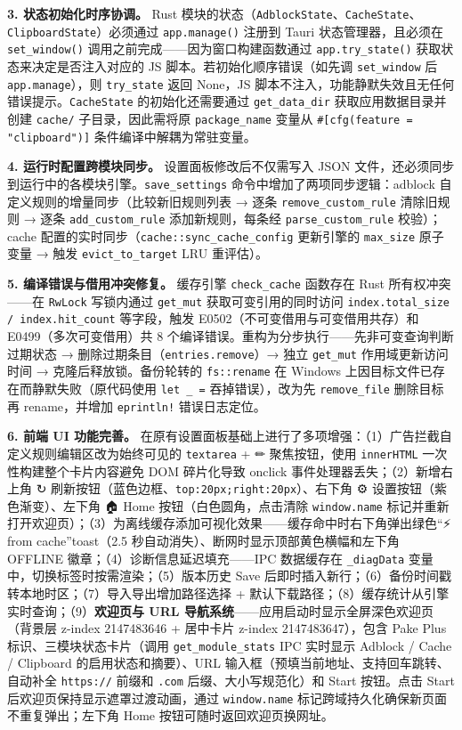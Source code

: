 \documentclass[12pt,a4paper]{ctexart}
\begin{document}
\textbf{3. 状态初始化时序协调。}
Rust 模块的状态（\texttt{AdblockState}、\texttt{CacheState}、\texttt{ClipboardState}）必须通过 \texttt{app.manage()} 注册到 Tauri 状态管理器，且必须在 \texttt{set\_window()} 调用之前完成——因为窗口构建函数通过 \texttt{app.try\_state()} 获取状态来决定是否注入对应的 JS 脚本。若初始化顺序错误（如先调 \texttt{set\_window} 后 \texttt{app.manage}），则 \texttt{try\_state} 返回 None，JS 脚本不注入，功能静默失效且无任何错误提示。\texttt{CacheState} 的初始化还需要通过 \texttt{get\_data\_dir} 获取应用数据目录并创建 \texttt{cache/} 子目录，因此需将原 \texttt{package\_name} 变量从 \texttt{\#[cfg(feature = "clipboard")]} 条件编译中解耦为常驻变量。

\textbf{4. 运行时配置跨模块同步。}
设置面板修改后不仅需写入 JSON 文件，还必须同步到运行中的各模块引擎。\texttt{save\_settings} 命令中增加了两项同步逻辑：adblock 自定义规则的增量同步（比较新旧规则列表 → 逐条 \texttt{remove\_custom\_rule} 清除旧规则 → 逐条 \texttt{add\_custom\_rule} 添加新规则，每条经 \texttt{parse\_custom\_rule} 校验）；cache 配置的实时同步（\texttt{cache::sync\_cache\_config} 更新引擎的 \texttt{max\_size} 原子变量 → 触发 \texttt{evict\_to\_target} LRU 重评估）。

\textbf{5. 编译错误与借用冲突修复。}
缓存引擎 \texttt{check\_cache} 函数存在 Rust 所有权冲突——在 \texttt{RwLock} 写锁内通过 \texttt{get\_mut} 获取可变引用的同时访问 \texttt{index.total\_size / index.hit\_count} 等字段，触发 E0502（不可变借用与可变借用共存）和 E0499（多次可变借用）共 8 个编译错误。重构为分步执行——先非可变查询判断过期状态 → 删除过期条目（\texttt{entries.remove}）→ 独立 \texttt{get\_mut} 作用域更新访问时间 → 克隆后释放锁。备份轮转的 \texttt{fs::rename} 在 Windows 上因目标文件已存在而静默失败（原代码使用 \texttt{let \_ =} 吞掉错误），改为先 \texttt{remove\_file} 删除目标再 rename，并增加 \texttt{eprintln!} 错误日志定位。

\textbf{6. 前端 UI 功能完善。}
在原有设置面板基础上进行了多项增强：（1）广告拦截自定义规则编辑区改为始终可见的 \texttt{textarea} + ✏ 聚焦按钮，使用 \texttt{innerHTML} 一次性构建整个卡片内容避免 DOM 碎片化导致 onclick 事件处理器丢失；（2）新增右上角 ↻ 刷新按钮（蓝色边框、\texttt{top:20px;right:20px}）、右下角 ⚙ 设置按钮（紫色渐变）、左下角 🏠 Home 按钮（白色圆角，点击清除 \texttt{window.name} 标记并重新打开欢迎页）；（3）为离线缓存添加可视化效果——缓存命中时右下角弹出绿色``⚡ from cache''toast（2.5 秒自动消失）、断网时显示顶部黄色横幅和左下角 OFFLINE 徽章；（4）诊断信息延迟填充——IPC 数据缓存在 \texttt{\_diagData} 变量中，切换标签时按需渲染；（5）版本历史 Save 后即时插入新行；（6）备份时间戳转本地时区；（7）导入导出增加路径选择 + 默认下载路径；（8）缓存统计从引擎实时查询；（9）\textbf{欢迎页与 URL 导航系统}——应用启动时显示全屏深色欢迎页（背景层 z-index 2147483646 + 居中卡片 z-index 2147483647），包含 Pake Plus 标识、三模块状态卡片（调用 \texttt{get\_module\_stats} IPC 实时显示 Adblock / Cache / Clipboard 的启用状态和摘要）、URL 输入框（预填当前地址、支持回车跳转、自动补全 \texttt{https://} 前缀和 \texttt{.com} 后缀、大小写规范化）和 Start 按钮。点击 Start 后欢迎页保持显示遮罩过渡动画，通过 \texttt{window.name} 标记跨域持久化确保新页面不重复弹出；左下角 Home 按钮可随时返回欢迎页换网址。
\end{document}
